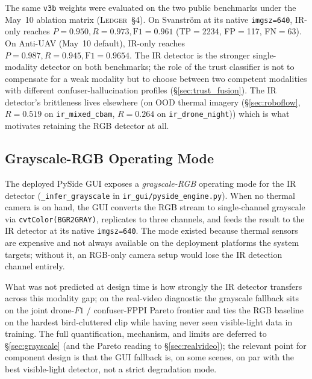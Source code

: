 \documentclass[12pt,a4paper,oneside,openright]{book}
\begin{document}
The same \texttt{v3b} weights were evaluated on the two public benchmarks under the May~10 ablation matrix (\textsc{Ledger}~\S4). On Svanstr\"om at its native \texttt{imgsz=640}, IR-only reaches $P=0.950, R=0.973, \text{F1}=0.961$ (TP$=$2234, FP$=$117, FN$=$63). On Anti-UAV (May~10 default), IR-only reaches $P=0.987, R=0.945, \text{F1}=0.9654$. The IR detector is the stronger single-modality detector on both benchmarks; the role of the trust classifier is not to compensate for a weak modality but to choose between two competent modalities with different confuser-hallucination profiles (\S\ref{sec:trust_fusion}). The IR detector's brittleness lives elsewhere (on OOD thermal imagery (\S\ref{sec:roboflow}, $R=0.519$ on \texttt{ir\_mixed\_cbam}, $R=0.264$ on \texttt{ir\_drone\_night})) which is what motivates retaining the RGB detector at all.

\subsection{Grayscale-RGB Operating Mode}
\label{sec:ir_grayscale_mode}

The deployed PySide GUI exposes a \emph{grayscale-RGB} operating mode for the IR detector (\texttt{\_infer\_grayscale} in \texttt{ir\_gui/pyside\_engine.py}). When no thermal camera is on hand, the GUI converts the RGB stream to single-channel grayscale via \texttt{cvtColor(BGR2GRAY)}, replicates to three channels, and feeds the result to the IR detector at its native \texttt{imgsz=640}. The mode existed because thermal sensors are expensive and not always available on the deployment platforms the system targets; without it, an RGB-only camera setup would lose the IR detection channel entirely.

What was not predicted at design time is how strongly the IR detector transfers across this modality gap; on the real-video diagnostic the grayscale fallback sits on the joint drone-$F1$ / confuser-FPPI Pareto frontier and ties the RGB baseline on the hardest bird-cluttered clip while having never seen visible-light data in training. The full quantification, mechanism, and limits are deferred to \S\ref{sec:grayscale} (and the Pareto reading to \S\ref{sec:realvideo}); the relevant point for component design is that the GUI fallback is, on some scenes, on par with the best visible-light detector, not a strict degradation mode.
\end{document}
